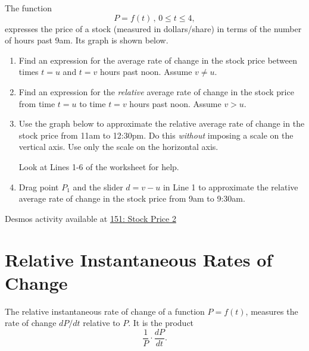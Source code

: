 \documentclass{ximera}
\begin{document}
\begin{question} \label{Qdfl3r3}

The function 
\[
 P = f(t) \, , \, 0\leq t \leq 4,
\]
expresses the price of a stock (measured in dollars/share) in terms of the number of hours past 9am. Its graph is shown below.

\begin{enumerate}

\item Find an expression for the average rate of change in the stock price between times $t=u$ and $t=v$ hours past noon. Assume $v\neq u$.

\item Find an expression for the \emph{relative} average rate of change in the stock price from time $t=u$ to time $t=v$ hours past noon. Assume $v>u$.

\item Use the graph below to approximate the relative average rate of change in the stock price from 11am to 12:30pm. Do this \emph{without} imposing a scale on the vertical axis. Use only the scale on the horizontal axis.

Look at Lines 1-6 of the worksheet for help. 

\item Drag point $P_1$ and the slider $d=v-u$ in Line 1 to approximate the relative average rate of change in the stock price from 9am to 9:30am.

\end{enumerate}

\begin{onlineOnly}
    \begin{center}
\end{center}
\end{onlineOnly}

Desmos activity available at \href{https://www.desmos.com/calculator/pdmoelxdap}{151: Stock Price 2}

\end{question}



\section{Relative Instantaneous Rates of Change}
The relative instantaneous rate of change of a function $P=f(t)$, measures the rate of change $dP/dt$ relative to $P$. It is the 
product
\[
   \frac{1}{P} \cdot \frac{dP}{dt} .
\]
\end{document}
